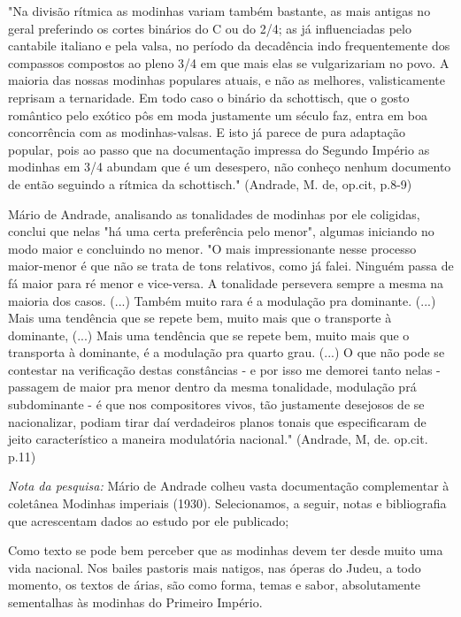 "Na divisão rítmica as modinhas variam também bastante, as mais antigas
no geral preferindo os cortes binários do C ou do 2/4; as já
influenciadas pelo cantabile italiano e pela valsa, no período da
decadência indo frequentemente dos compassos compostos ao pleno 3/4 em
que mais elas se vulgarizariam no povo. A maioria das nossas modinhas
populares atuais, e não as melhores, valisticamente reprisam a
ternaridade. Em todo caso o binário da schottisch, que o gosto romântico
pelo exótico pôs em moda justamente um século faz, entra em boa
concorrência com as modinhas-valsas. E isto já parece de pura adaptação
popular, pois ao passo que na documentação impressa do Segundo Império
as modinhas em 3/4 abundam que é um desespero, não conheço nenhum
documento de então seguindo a rítmica da schottisch." (Andrade, M. de,
op.cit, p.8-9)

Mário de Andrade, analisando as tonalidades de modinhas por ele
coligidas, conclui que nelas "há uma certa preferência pelo menor",
algumas iniciando no modo maior e concluindo no menor. "O mais
impressionante nesse processo maior-menor é que não se trata de tons
relativos, como já falei. Ninguém passa de fá maior para ré menor e
vice-versa. A tonalidade persevera sempre a mesma na maioria dos casos.
(...) Também muito rara é a modulação pra dominante. (...) Mais uma
tendência que se repete bem, muito mais que o transporte à dominante,
(...) Mais uma tendência que se repete bem, muito mais que o transporta
à dominante, é a modulação pra quarto grau. (...) O que não pode se
contestar na verificação destas constâncias - e por isso me demorei
tanto nelas - passagem de maior pra menor dentro da mesma tonalidade,
modulação prá subdominante - é que nos compositores vivos, tão
justamente desejosos de se nacionalizar, podiam tirar daí verdadeiros
planos tonais que especificaram de jeito característico a maneira
modulatória nacional." (Andrade, M, de. op.cit. p.11)

\emph{Nota da pesquisa:} Mário de Andrade colheu vasta documentação
complementar à coletânea Modinhas imperiais (1930). Selecionamos, a
seguir, notas e bibliografia que acrescentam dados ao estudo por ele
publicado;

Como texto se pode bem perceber que as modinhas devem ter desde muito
uma vida nacional. Nos bailes pastoris mais natigos, nas óperas do
Judeu, a todo momento, os textos de árias, são como forma, temas e
sabor, absolutamente sementalhas às modinhas do Primeiro Império.

